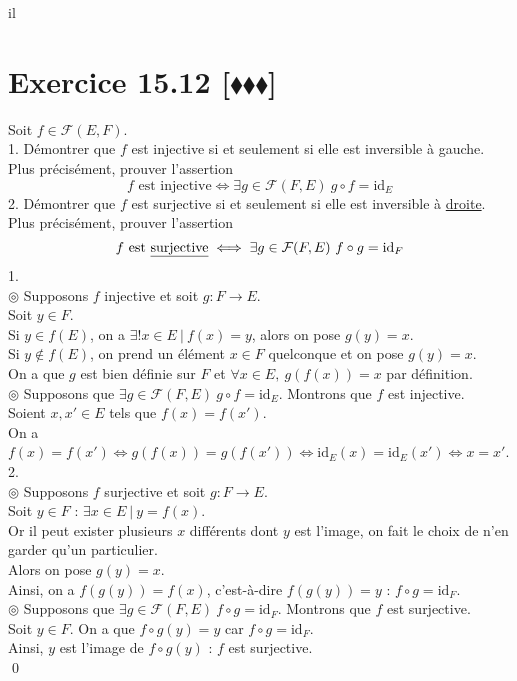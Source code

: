 il\documentclass[10pt]{article}
\begin{document}
\section*{Exercice 15.12 [$\blacklozenge\blacklozenge\blacklozenge$]}
\begin{tcolorbox}[enhanced, width=7.6in, center, size=fbox, fontupper=\large, drop shadow southwest]
    Soit $f \in \mathcal{F}(E,F)$.\\
    1. Démontrer que $f$ est injective si et seulement si elle est inversible à gauche.\\
    Plus précisément, prouver l'assertion
    \begin{equation*}
        f \text{ est injective} \iff \exists g \in \mathcal{F}(F,E) ~ g \circ f = \text{id}_E
    \end{equation*}
    2. Démontrer que $f$ est surjective si et seulement si elle est inversible à \underline{droite}.\\
    Plus précisément, prouver l'assertion
    \begin{equation*}
        f \text{ est \underline{surjective}} \iff \exists g \in \mathcal{F}(F,E) ~ f \circ g = \text{id}_F 
    \end{equation*}
    1.\\
    $\circledcirc$ Supposons $f$ injective et soit $g:F\to E$.\\
    Soit $y \in F$.\\
    Si $y\in f(E)$, on a $\exists!x\in E ~ | ~ f(x) = y$, alors on pose $g(y)=x$.\\
    Si $y\notin f(E)$, on prend un élément $x\in F$ quelconque et on pose $g(y)=x$.\\
    On a que $g$ est bien définie sur $F$ et $\forall x \in E, ~ g(f(x))=x$ par définition.\\[0.15cm]
    $\circledcirc$ Supposons que $\exists g \in \mathcal{F}(F, E) ~ g \circ f = \text{id}_E$. Montrons que $f$ est injective.\\
    Soient $x,x'\in E$ tels que $f(x)=f(x')$.\\
    On a $f(x)=f(x') \iff g(f(x))=g(f(x')) \iff \text{id}_E(x) = \text{id}_E(x') \iff x = x'$.\\[0.2cm]
    2.\\
    $\circledcirc$ Supposons $f$ surjective et soit $g:F\to E$.\\
    Soit $y \in F$ : $\exists x \in E ~ | ~ y = f(x)$.\\
    Or il peut exister plusieurs $x$ différents dont $y$ est l'image, on fait le choix de n'en garder qu'un particulier.\\
    Alors on pose $g(y) = x$.\\
    Ainsi, on a $f(g(y)) = f(x)$, c'est-à-dire $f(g(y))=y$ : $f\circ g = \text{id}_F$.\\[0.15cm]
    $\circledcirc$ Supposons que $\exists g \in \mathcal{F}(F, E) ~ f \circ g = \text{id}_F$. Montrons que $f$ est surjective.\\
    Soit $y \in F$. On a que $f\circ g(y) = y$ car $f \circ g = \text{id}_F$.\\
    Ainsi, $y$ est l'image de $f\circ g(y)$ : $f$ est surjective.\\
    \qed
\end{tcolorbox}
\end{document}
